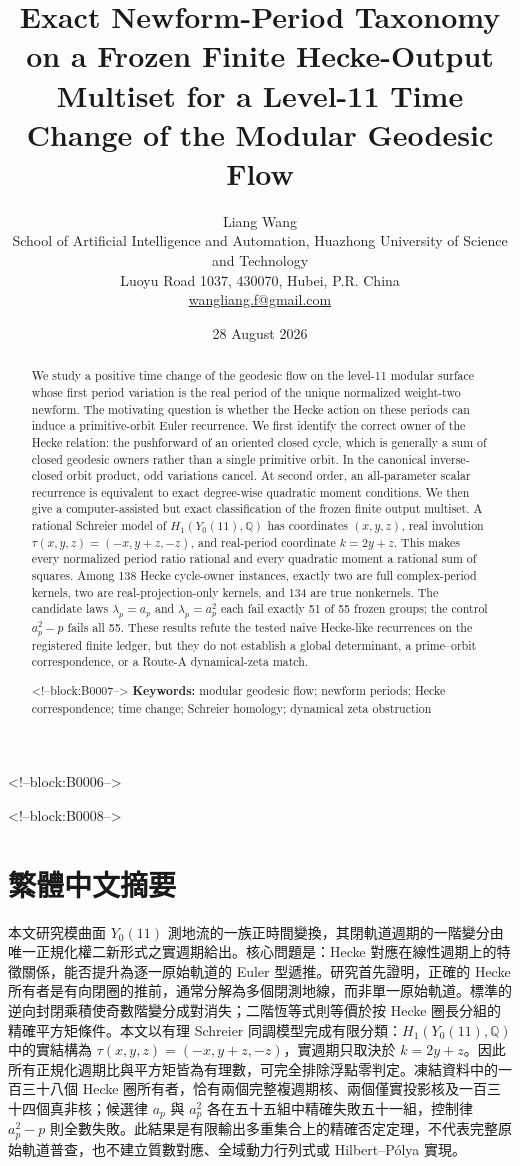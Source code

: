 \documentclass[11pt]{article}
\title{Exact Newform-Period Taxonomy on a Frozen Finite Hecke-Output Multiset for a Level-11 Time Change of the Modular Geodesic Flow}
\author{Liang Wang\\[2pt]
\small School of Artificial Intelligence and Automation, Huazhong University of Science and Technology\\
\small Luoyu Road 1037, 430070, Hubei, P.R. China\\
\small \href{mailto:wangliang.f@gmail.com}{wangliang.f@gmail.com}}
\date{28 August 2026}
\theoremstyle{definition}
\theoremstyle{remark}
\newcommand{\QQ}{\mathbb Q}
\begin{document}
\maketitle

<!--block:B0006-->
\begin{abstract}
We study a positive time change of the geodesic flow on the level-11 modular surface whose first period variation is the real period of the unique normalized weight-two newform. The motivating question is whether the Hecke action on these periods can induce a primitive-orbit Euler recurrence. We first identify the correct owner of the Hecke relation: the pushforward of an oriented closed cycle, which is generally a sum of closed geodesic owners rather than a single primitive orbit. In the canonical inverse-closed orbit product, odd variations cancel. At second order, an all-parameter scalar recurrence is equivalent to exact degree-wise quadratic moment conditions. We then give a computer-assisted but exact classification of the frozen finite output multiset. A rational Schreier model of $H_1(Y_0(11),\QQ)$ has coordinates $(x,y,z)$, real involution $\tau(x,y,z)=(-x,y+z,-z)$, and real-period coordinate $k=2y+z$. This makes every normalized period ratio rational and every quadratic moment a rational sum of squares. Among 138 Hecke cycle-owner instances, exactly two are full complex-period kernels, two are real-projection-only kernels, and 134 are true nonkernels. The candidate laws $\lambda_p=a_p$ and $\lambda_p=a_p^2$ each fail exactly 51 of 55 frozen groups; the control $a_p^2-p$ fails all 55. These results refute the tested naive Hecke-like recurrences on the registered finite ledger, but they do not establish a global determinant, a prime--orbit correspondence, or a Route-A dynamical-zeta match.

<!--block:B0007-->
\medskip
\noindent\textbf{Keywords:} modular geodesic flow; newform periods; Hecke correspondence; time change; Schreier homology; dynamical zeta obstruction
\end{abstract}

<!--block:B0008-->
\section*{繁體中文摘要}
本文研究模曲面 $Y_0(11)$ 測地流的一族正時間變換，其閉軌道週期的一階變分由唯一正規化權二新形式之實週期給出。核心問題是：Hecke 對應在線性週期上的特徵關係，能否提升為逐一原始軌道的 Euler 型遞推。研究首先證明，正確的 Hecke 所有者是有向閉圈的推前，通常分解為多個閉測地線，而非單一原始軌道。標準的逆向封閉乘積使奇數階變分成對消失；二階恆等式則等價於按 Hecke 圈長分組的精確平方矩條件。本文以有理 Schreier 同調模型完成有限分類：$H_1(Y_0(11),\QQ)$ 中的實結構為 $\tau(x,y,z)=(-x,y+z,-z)$，實週期只取決於 $k=2y+z$。因此所有正規化週期比與平方矩皆為有理數，可完全排除浮點零判定。凍結資料中的一百三十八個 Hecke 圈所有者，恰有兩個完整複週期核、兩個僅實投影核及一百三十四個真非核；候選律 $a_p$ 與 $a_p^2$ 各在五十五組中精確失敗五十一組，控制律 $a_p^2-p$ 則全數失敗。此結果是有限輸出多重集合上的精確否定定理，不代表完整原始軌道普查，也不建立質數對應、全域動力行列式或 Hilbert--Pólya 實現。
\end{document}
